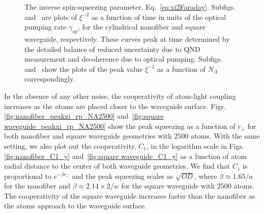 \documentclass[preprint,aps,pra,onecolumn,superscriptaddress]{revtex4-1} %
\newcommand{\SWG}{square waveguide\xspace}%
\begin{document}
\begin{figure}[htb]
\centering
 \begin{minipage}[h]{0.95\linewidth}
    \hfill
   \end{minipage}\vfill
   \begin{minipage}[h]{0.95\linewidth}
       \hfill
   \end{minipage}
\caption{ The inverse spin-squeezing parameter, Eq.~\eqref{eq:xi2Faraday}.  Subfigs.~\protect{} and~\protect{} are plots of $ \xi^{-2} $  as a function of time in units of the optical pumping rate $\gamma_{op}$, for the cylindrical nanofiber and square waveguide, respectively. These curves peak at time determined by the detailed balance of reduced uncertainty due to QND measurement and decoherence due to optical pumping.  Subfigs.~\protect{} and~\protect{} show the plots of the peak value $ \xi^{-2} $ as a function of $ N_A $ correspondingly. }\label{fig:xi_rpfix_NA_t}
\end{figure}

In the absence of any other noise, the cooperativity of atom-light coupling increases as the atoms are placed closer to the waveguide surface. Figs.\ref{fig:nanofiber_peakxi_rp_NA2500} and~\ref{fig:square waveguide_peakxi_rp_NA2500} show the peak squeezing  as a function of $ r\!_\perp $ for both nanofiber and square waveguide geometries with $2500$ atoms. With the same setting, we also plot out the cooperativity, $ C_1 $, in the logarithm scale in Figs.\ref{fig:nanofiber_C1_y} and~\ref{fig:square waveguide_C1_y} as a function of atom radial distance to the center of both waveguide geometries. We find that $C_1$ is proportional to $ e^{-\beta r\!_\perp} $ and the peak squeezing scales as $ \sqrt{OD} $, where $ \beta \approx 1.65/a $ for the nanofiber and $ \beta \approx 2.14\times 2/w $ for the \SWG with $2500$ atoms. The cooperativity of the \SWG increases faster than the nanofiber as the atoms approach to the waveguide surface. 
\end{document}
